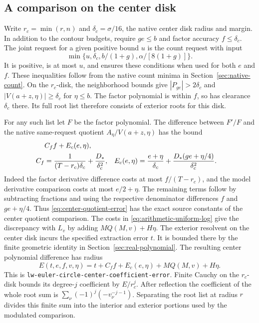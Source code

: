 \documentclass[11pt]{amsart}
\theoremstyle{definition}
\theoremstyle{remark}
\numberwithin{equation}{section}
\newcommand{\code}[1]{\nolinkurl{#1}}
\begin{document}
\subsection{A comparison on the center disk}

Write $r_c=\min(r,n)$ and $\delta_c=\sigma/16$,
the native center disk radius and margin. In addition
to the contour budgets, require $ge\le b$ and factor
accuracy $f\le\delta_c$. The joint request for a
given positive bound $u$ is the count request with input
\[
  \min\{u,\delta_c,b/(1+g),\alpha/[8(1+g)]\}.
\]
It is positive, is at most $u$, and ensures these
conditions when used for both $e$ and $f$. These
inequalities follow from the native count minima
in Section~\ref{sec:native-count}.
On the $r_c$-disk, the neighborhood bounds give
$|P_{ge}|>2\delta_c$ and $|V(a+z,\eta)|\ge\delta_c$
for $\eta\le b$. The factor polynomial is within
$f$, so has clearance $\delta_c$ there. Its full
root list therefore consists of exterior roots for
this disk.

For any such list let $F$ be the factor polynomial.
The difference between $F'/F$ and the native
same-request quotient $A_\eta/V(a+z,\eta)$ has the
bound
\begin{align}
          &C_f f+ E_c(e,\eta), \label{eq:center-quotient-error}\\
 C_f&=\frac1{(T-r_c)\delta_c}+\frac{D_*}{\delta_c^2},
 &E_c(e,\eta)&=\frac{e+\eta}{\delta_c}
                    +\frac{D_*(ge+\eta/4)}{\delta_c^2}.
\notag
\end{align}
Indeed the factor derivative difference costs at most
$f/(T-r_c)$, and the model derivative comparison
costs at most $e/2+\eta$. The remaining terms follow
by subtracting fractions and using the respective
denominator differences $f$ and $ge+\eta/4$.
Thus \eqref{eq:center-quotient-error} has the exact
source constants of the center quotient comparison.
The costs in \eqref{eq:arithmetic-uniform-log} give
the discrepancy with $L_v$ by adding $M Q(M,v)+H\eta$.
The exterior resolvent on the center disk incurs the
specified extraction error $t$. It is bounded there
by the finite geometric identity in
Section~\ref{sec:real-polynomial}. The resulting
center polynomial difference has radius
\begin{equation}\label{eq:native-center-cost}
             E(t,e,f,v,\eta)
                 =t+C_f f+E_c(e,\eta)+M Q(M,v)+H\eta.
\end{equation}
This is \code{lw-euler-circle-center-coefficient-error}.
Finite Cauchy on the $r_c$-disk bounds its degree-$j$
coefficient by $E/r_c^j$. After reflection the
coefficient of the whole root sum is
\(\sum_\nu(-1)^j(-v_\nu^{-j-1})\). Separating the
root list at radius $r$ divides this finite sum into
the interior and exterior portions used by the
modulated comparison.
\end{document}
